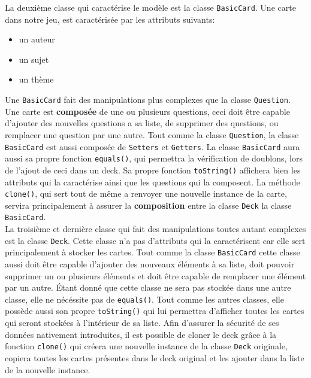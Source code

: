 La deuxième classe qui caractérise le modèle est la classe \verb|BasicCard|.
Une carte dans notre jeu, est caractérisée par les attributs suivants:
\begin{itemize}
\item un auteur
\item un sujet
\item un thème
\end{itemize}
Une \verb|BasicCard| fait des manipulations plus complexes que la classe \verb|Question|.
Une carte est \textbf{composée} de une ou plusieurs questions, ceci doit être capable d'ajouter des nouvelles questions a sa liste, de supprimer des questions, ou remplacer une question par une autre.
Tout comme la classe \verb|Question|, la classe \verb|BasicCard| est aussi composée de \verb|Setters| et \verb|Getters|.
La classe \verb|BasicCard| aura aussi sa propre fonction \verb|equals()|, qui permettra la vérification de doublons, lors de l'ajout de ceci dans un deck.
Sa propre fonction \verb|toString()| affichera bien les attributs qui la caractérise ainsi que les questions qui la composent.
La méthode \verb|clone()|, qui sert tout de même a renvoyer une nouvelle instance de la carte, servira principalement à assurer la \textbf{composition} entre la classe \verb|Deck| la classe \verb|BasicCard|.\\

La troisième et dernière classe qui fait des manipulations toutes autant complexes est la classe \verb|Deck|.
Cette classe n'a pas d'attributs qui la caractérisent car elle sert principalement à stocker les cartes.
Tout comme la classe \verb|BasicCard| cette classe aussi doit être capable d'ajouter des nouveaux éléments à sa liste, doit pouvoir supprimer un ou plusieurs éléments et doit être capable de remplacer une élément par un autre.
Étant donné que cette classe ne sera pas stockée dans une autre classe, elle ne nécéssite pas de \verb|equals()|.
Tout comme les autres classes, elle possède aussi son propre \verb|toString()| qui lui permettra d'afficher toutes les cartes qui seront stockées à l'intérieur de sa liste.
Afin d'assurer la sécurité de ses données nativement introduites, il est possible de cloner le deck grâce à la fonction \verb|clone()| qui créera une nouvelle instance de la classe \verb|Deck| originale, copiera toutes les cartes présentes dans le deck original et les ajouter dans la liste de la nouvelle instance.

\newpage
